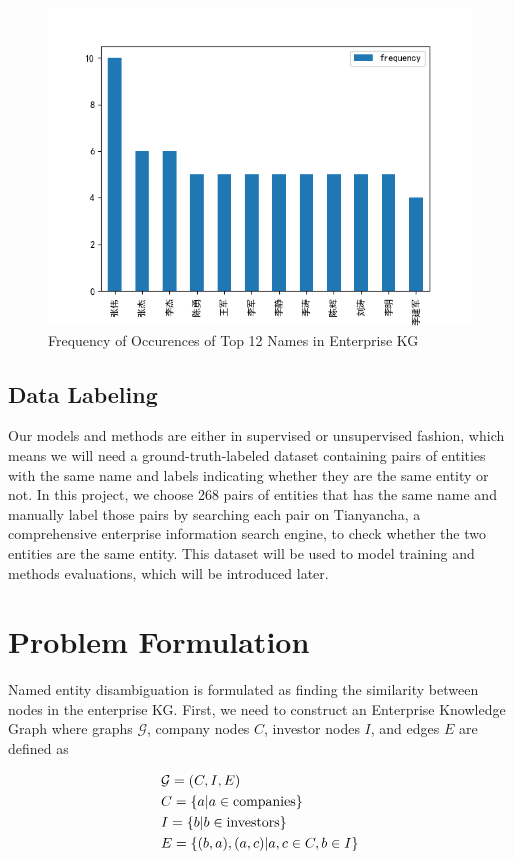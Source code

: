 \documentclass[sigconf, nonacm]{acmart}
\begin{document}
\begin{figure}[htbp]
    \centering
    \includegraphics[scale = 0.4]{figures/counts.png}
    \caption{Frequency of Occurences of Top 12 Names in Enterprise KG}
    \label{fig:counts}
\end{figure}


\subsection{Data Labeling}
Our models and methods are either in supervised or unsupervised fashion, which means we will need a ground-truth-labeled dataset containing pairs of entities with the same name and labels indicating whether they are the same entity or not. In this project, we choose 268 pairs of entities that has the same name and manually label those pairs by searching each pair on Tianyancha, a comprehensive enterprise information search engine, to check whether the two entities are the same entity. This dataset will be used to model training and methods evaluations, which will be introduced later.

\section{Problem Formulation}
Named entity disambiguation is formulated as finding the similarity between nodes in the enterprise KG. First, we need to construct an Enterprise Knowledge Graph where graphs $\mathcal{G}$, company nodes $C$, investor nodes $I$, and edges $E$ are defined as  

$$\begin{aligned}
&\mathcal{G} = (C, I, E)\\
&C = \{a | a \in {\rm companies} \}\\
&I = \{b | b \in {\rm investors}\}\\
&E = \{(b, a), (a, c) | a,c \in C , b \in I\}
\end{aligned}
$$
\end{document}
